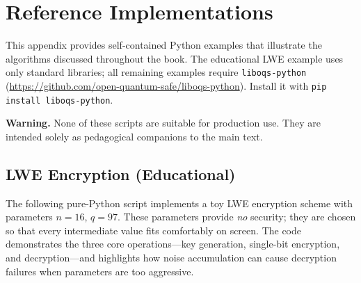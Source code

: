 \chapter{Reference Implementations}
\label{app:implementations}

This appendix provides self-contained Python examples that illustrate the
algorithms discussed throughout the book. The educational LWE example uses
only standard libraries; all remaining examples require \texttt{liboqs-python}
(\url{https://github.com/open-quantum-safe/liboqs-python}).
Install it with \texttt{pip install liboqs-python}.

\medskip
\noindent\textbf{Warning.} None of these scripts are suitable for production
use. They are intended solely as pedagogical companions to the main text.

\section{LWE Encryption (Educational)}
\label{app:lwe-impl}

The following pure-Python script implements a toy LWE encryption scheme with
parameters $n=16$, $q=97$. These parameters provide \emph{no} security;
they are chosen so that every intermediate value fits comfortably on screen.
The code demonstrates the three core operations---key generation, single-bit
encryption, and decryption---and highlights how noise accumulation can cause
decryption failures when parameters are too aggressive.

